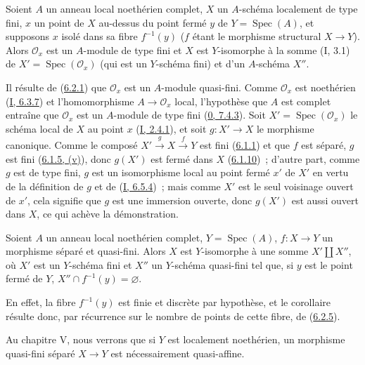 \begin{proposition}[6.2.5]
\label{II.6.2.5-fr}
Soient $A$ un anneau local noethérien complet, $X$ un $A$-schéma localement
de type fini, $x$ un point de $X$ au-dessus du point fermé $y$ de
$Y=\operatorname{Spec}(A)$, et supposons $x$ isolé dans sa fibre
$f^{-1}(y)$ ($f$ étant le morphisme structural $X\to Y$). Alors
$\mathcal{O}_x$ est un $A$-module de type fini et $X$ est $Y$-isomorphe à la
somme (I, 3.1) de
$X'=\operatorname{Spec}(\mathcal{O}_x)$ (qui est un $Y$-schéma fini) et d'un
$A$-schéma $X''$.
\end{proposition}

Il résulte de (\hyperref[II.6.2.1-fr]{6.2.1}) que $\mathcal{O}_x$ est un
$A$-module quasi-fini. Comme $\mathcal{O}_x$ est noethérien
(\hyperref[I.6.3.7-fr]{I, 6.3.7}) et l'homomorphisme
$A\to\mathcal{O}_x$ local, l'hypothèse que $A$ est complet entraîne que
$\mathcal{O}_x$ est un $A$-module de type fini
(\hyperref[0.7.4.3-fr]{0, 7.4.3}). Soit
$X'=\operatorname{Spec}(\mathcal{O}_x)$ le schéma local de $X$ au point $x$
(\hyperref[I.2.4.1-fr]{I, 2.4.1}), et soit $g:X'\to X$ le morphisme
canonique. Comme le composé $X'\xrightarrow{g}X\xrightarrow{f}Y$ est fini
(\hyperref[II.6.1.1-fr]{6.1.1}) et que $f$ est séparé, $g$ est fini
(\hyperref[II.6.1.5-fr]{6.1.5, (v)}), donc $g(X')$ est fermé dans $X$
(\hyperref[II.6.1.10-fr]{6.1.10})~; d'autre part, comme $g$ est de type fini,
$g$ est un isomorphisme local au point fermé $x'$ de $X'$ en vertu de la
définition de $g$ et de (\hyperref[I.6.5.4-fr]{I, 6.5.4})~; mais comme $X'$
est le seul voisinage ouvert de $x'$, cela signifie que $g$ est une immersion
ouverte, donc $g(X')$ est aussi ouvert dans $X$, ce qui achève la
démonstration.

\begin{corollary}[6.2.6]
\label{II.6.2.6-fr}
Soient $A$ un anneau local noethérien complet, $Y=\operatorname{Spec}(A)$,
$f:X\to Y$ un morphisme séparé et quasi-fini. Alors $X$ est $Y$-isomorphe à
une somme $X'\amalg X''$, où $X'$ est un $Y$-schéma fini et $X''$ un
$Y$-schéma quasi-fini tel que, si $y$ est le point fermé de $Y$,
$X''\cap f^{-1}(y)=\varnothing$.
\end{corollary}

En effet, la fibre $f^{-1}(y)$ est finie et discrète par hypothèse, et le
corollaire résulte donc, par récurrence sur le nombre de points de cette
fibre, de (\hyperref[II.6.2.5-fr]{6.2.5}).

\begin{remark}[6.2.7]
\label{II.6.2.7-fr}
Au chapitre V, nous verrons que si $Y$ est localement noethérien, un morphisme
quasi-fini séparé $X\to Y$ est nécessairement quasi-affine.
\end{remark}

